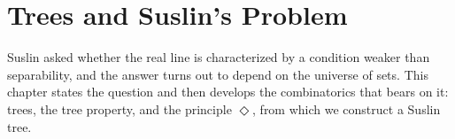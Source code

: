 \chapter{Trees and Suslin's Problem} \label{Ch4:CH}
\thispagestyle{empty}

Suslin asked whether the real line is characterized by a condition weaker than separability, and the answer turns out to depend on the universe of sets. This chapter states the question and then develops the combinatorics that bears on it: trees, the tree property, and the principle $\Diamond$, from which we construct a Suslin tree.







